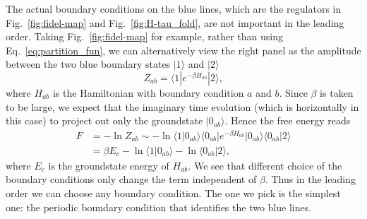 The actual boundary conditions on the blue lines, which are the regulators in Fig.~\ref{fig:fidel-map} and Fig.~\ref{fig:H-tau_fold}, are not important in the leading order. Taking Fig.~\ref{fig:fidel-map} for example, rather than using Eq.~\eqref{eq:partition_fun}, we can alternatively view the right panel as the amplitude between the two blue boundary states $|1\rangle$ and $|2\rangle$
\begin{equation}
Z_{ab} =  \langle 1 | e^{ - \beta H_{ab}} | 2 \rangle  , 
\end{equation}
where $H_{ab}$ is the Hamiltonian with boundary condition $a$ and $b$. Since $\beta$ is taken to be large, we expect that the imaginary time evolution (which is horizontally in this case) to project out only the groundstate $|0_{ab}\rangle $. Hence the free energy reads
\begin{equation}
\begin{aligned}
F &=  - \ln Z_{ab}  \sim - \ln \langle 1 |0_{ab} \rangle \langle   0_{ab}  |e^{ - \beta H_{ab}}|0_{ab} \rangle \langle 0_{ab} | 2 \rangle \\
&= \beta  E_c - \ln \langle 1| 0_{ab} \rangle  - \ln \langle 0_{ab}  |2 \rangle,
\end{aligned}
\end{equation}
where $E_c$ is the groundstate energy of $H_{ab}$. We see that different choice of the boundary conditions only change the term independent of $\beta$. Thus in the leading order we can choose any boundary condition. The one we pick is the simplest one: the periodic boundary condition that identifies the two blue lines. 



